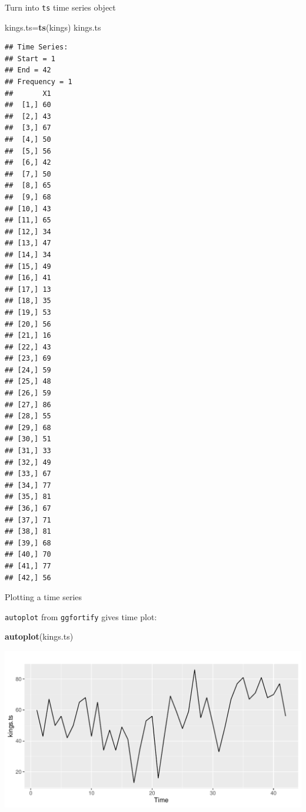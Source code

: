 \documentclass[ignorenonframetext,]{beamer}
\newenvironment{Shaded}{\begin{snugshade}}{\end{snugshade}}
\newcommand{\KeywordTok}[1]{\textcolor[rgb]{0.13,0.29,0.53}{\textbf{#1}}}
\newcommand{\NormalTok}[1]{#1}
\begin{document}
\begin{frame}[fragile]{Turn into \texttt{ts} time series object}
\protect\hypertarget{turn-into-ts-time-series-object}{}

\begin{Shaded}
\begin{Highlighting}[]
\NormalTok{kings.ts=}\KeywordTok{ts}\NormalTok{(kings)}
\NormalTok{kings.ts}
\end{Highlighting}
\end{Shaded}

\begin{verbatim}
## Time Series:
## Start = 1 
## End = 42 
## Frequency = 1 
##       X1
##  [1,] 60
##  [2,] 43
##  [3,] 67
##  [4,] 50
##  [5,] 56
##  [6,] 42
##  [7,] 50
##  [8,] 65
##  [9,] 68
## [10,] 43
## [11,] 65
## [12,] 34
## [13,] 47
## [14,] 34
## [15,] 49
## [16,] 41
## [17,] 13
## [18,] 35
## [19,] 53
## [20,] 56
## [21,] 16
## [22,] 43
## [23,] 69
## [24,] 59
## [25,] 48
## [26,] 59
## [27,] 86
## [28,] 55
## [29,] 68
## [30,] 51
## [31,] 33
## [32,] 49
## [33,] 67
## [34,] 77
## [35,] 81
## [36,] 67
## [37,] 71
## [38,] 81
## [39,] 68
## [40,] 70
## [41,] 77
## [42,] 56
\end{verbatim}

\end{frame}

\begin{frame}[fragile]{Plotting a time series}
\protect\hypertarget{plotting-a-time-series}{}

\texttt{autoplot} from \texttt{ggfortify} gives time plot:

\begin{Shaded}
\begin{Highlighting}[]
\KeywordTok{autoplot}\NormalTok{(kings.ts)}
\end{Highlighting}
\end{Shaded}

\includegraphics{figure/Kings-Time-Series-1.pdf}

\end{frame}
\end{document}
